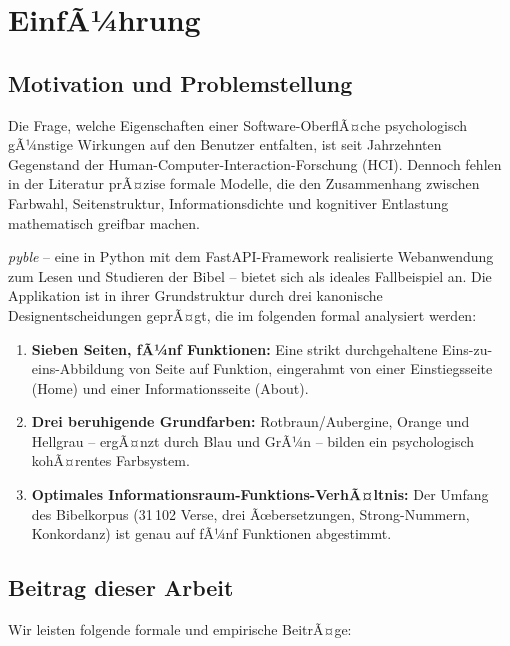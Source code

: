 ﻿\documentclass[a4paper,12pt]{article}
\theoremstyle{definition}
\begin{document}
\tableofcontents
\newpage

\section{EinfÃ¼hrung}

\subsection{Motivation und Problemstellung}

Die Frage, welche Eigenschaften einer Software-OberflÃ¤che psychologisch gÃ¼nstige
Wirkungen auf den Benutzer entfalten, ist seit Jahrzehnten Gegenstand der
Human-Computer-Interaction-Forschung (HCI). Dennoch fehlen in der Literatur
prÃ¤zise formale Modelle, die den Zusammenhang zwischen Farbwahl, Seitenstruktur,
Informationsdichte und kognitiver Entlastung mathematisch greifbar machen.

\textit{pyble} -- eine in Python mit dem FastAPI-Framework realisierte Webanwendung
zum Lesen und Studieren der Bibel -- bietet sich als ideales Fallbeispiel an. Die
Applikation ist in ihrer Grundstruktur durch drei kanonische Designentscheidungen
geprÃ¤gt, die im folgenden formal analysiert werden:

\begin{enumerate}
    \item \textbf{Sieben Seiten, fÃ¼nf Funktionen:} Eine strikt durchgehaltene
          Eins-zu-eins-Abbildung von Seite auf Funktion, eingerahmt von einer
          Einstiegsseite (Home) und einer Informationsseite (About).
    \item \textbf{Drei beruhigende Grundfarben:} Rotbraun/Aubergine, Orange und
          Hellgrau -- ergÃ¤nzt durch Blau und GrÃ¼n -- bilden ein psychologisch
          kohÃ¤rentes Farbsystem.
    \item \textbf{Optimales Informationsraum-Funktions-VerhÃ¤ltnis:} Der Umfang
          des Bibelkorpus (31\,102 Verse, drei Ãœbersetzungen, Strong-Nummern,
          Konkordanz) ist genau auf fÃ¼nf Funktionen abgestimmt.
\end{enumerate}

\subsection{Beitrag dieser Arbeit}

Wir leisten folgende formale und empirische BeitrÃ¤ge:
\end{document}
